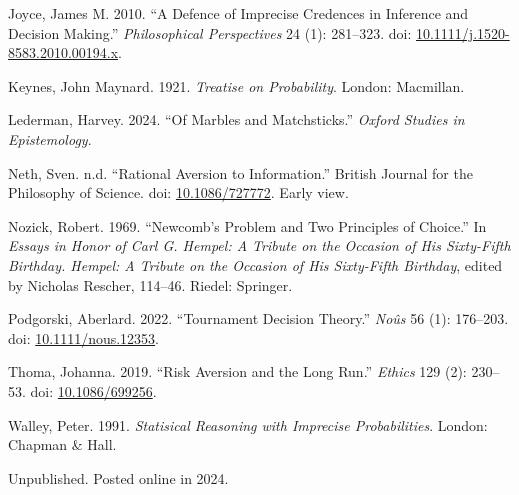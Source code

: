 \documentclass[
  10pt,
  letterpaper,
  DIV=11,
  numbers=noendperiod,
  twoside]{scrartcl}
\newlength{\cslhangindent}
\newenvironment{CSLReferences}[2] %
 {\begin{list}{}{%
  \setlength{\itemindent}{0pt}
  \setlength{\leftmargin}{0pt}
  \setlength{\parsep}{0pt}
  \ifodd #1
   \setlength{\leftmargin}{\cslhangindent}
   \setlength{\itemindent}{-1\cslhangindent}
  \fi
  \setlength{\itemsep}{#2\baselineskip}}}
 {\end{list}}
\begin{document}
\begin{CSLReferences}{1}{0}
Joyce, James M. 2010. {``A Defence of Imprecise Credences in Inference
and Decision Making.''} \emph{Philosophical Perspectives} 24 (1):
281--323. doi:
\href{https://doi.org/10.1111/j.1520-8583.2010.00194.x}{10.1111/j.1520-8583.2010.00194.x}.

Keynes, John Maynard. 1921. \emph{Treatise on Probability}. London:
Macmillan.

Lederman, Harvey. 2024. {``Of Marbles and Matchsticks.''} \emph{Oxford
Studies in Epistemology}.

Neth, Sven. n.d. {``Rational Aversion to Information.''} British Journal
for the Philosophy of Science. doi:
\href{https://doi.org/10.1086/727772}{10.1086/727772}. Early view.

Nozick, Robert. 1969. {``Newcomb's Problem and Two Principles of
Choice.''} In \emph{Essays in Honor of Carl {G}. Hempel: A Tribute on
the Occasion of His Sixty-Fifth Birthday. Hempel: A Tribute on the
Occasion of His Sixty-Fifth Birthday}, edited by Nicholas Rescher,
114--46. Riedel: Springer.

Podgorski, Aberlard. 2022. {``Tournament Decision Theory.''}
\emph{No{û}s} 56 (1): 176--203. doi:
\href{https://doi.org/10.1111/nous.12353}{10.1111/nous.12353}.

Thoma, Johanna. 2019. {``Risk Aversion and the Long Run.''}
\emph{Ethics} 129 (2): 230--53. doi:
\href{https://doi.org/10.1086/699256}{10.1086/699256}.

Walley, Peter. 1991. \emph{Statisical Reasoning with Imprecise
Probabilities}. London: Chapman \& Hall.

\end{CSLReferences}



\noindent Unpublished. Posted online in 2024.
\end{document}
